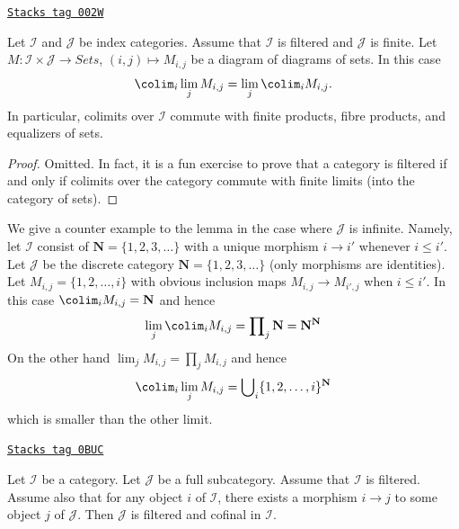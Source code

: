 \begin{lemma}
\label{categories-lemma-directed-commutes}
\href{https://stacks.math.columbia.edu/tag/002W}{\texttt{Stacks tag 002W}}

Let $\mathcal{I}$ and $\mathcal{J}$ be index categories.
Assume that $\mathcal{I}$ is filtered and $\mathcal{J}$ is finite.
Let $M : \mathcal{I} \times \mathcal{J} \to \textit{Sets}$,
$(i, j) \mapsto M_{i, j}$ be a diagram of diagrams of sets.
In this case
$$
\colim_i \lim_j M_{i, j}
=
\lim_j \colim_i M_{i, j}.
$$
In particular, colimits over $\mathcal{I}$ commute with finite products,
fibre products, and equalizers of sets.
\end{lemma}

\begin{proof}
Omitted. In fact, it is a fun exercise to prove that a category is
filtered if and only if colimits over the category commute with finite
limits (into the category of sets).
\end{proof}

We give a counter example to the lemma in
the case where $\mathcal{J}$ is infinite. Namely, let
$\mathcal{I}$ consist of $\mathbf{N} = \{1, 2, 3, \ldots\}$
with a unique morphism $i \to i'$ whenever $i \leq i'$.
Let $\mathcal{J}$ be the discrete category
$\mathbf{N} = \{1, 2, 3, \ldots\}$ (only morphisms are identities).
Let $M_{i, j} = \{1, 2, \ldots, i\}$ with obvious inclusion maps
$M_{i, j} \to M_{i', j}$ when $i \leq i'$. In this case
$\colim_i M_{i, j} = \mathbf{N}$ and hence
$$
\lim_j \colim_i M_{i, j}
=
\prod\nolimits_j \mathbf{N}
=
\mathbf{N}^\mathbf{N}
$$
On the other hand $\lim_j M_{i, j} = \prod\nolimits_j M_{i, j}$ and
hence
$$
\colim_i \lim_j M_{i, j}
=
\bigcup\nolimits_i \{1, 2, \ldots, i\}^{\mathbf{N}}
$$
which is smaller than the other limit.

\begin{lemma}
\label{categories-lemma-cofinal-in-filtered}
\href{https://stacks.math.columbia.edu/tag/0BUC}{\texttt{Stacks tag 0BUC}}

\begin{reference}
\cite[Proposition 3.2.4]{KS}
\end{reference}
Let $\mathcal{I}$ be a category. Let $\mathcal{J}$ be a full subcategory.
Assume that $\mathcal{I}$ is filtered. Assume also that for any object
$i$ of $\mathcal{I}$, there exists a morphism $i \to j$
to some object $j$ of $\mathcal{J}$. Then $\mathcal{J}$
is filtered and cofinal in $\mathcal{I}$.
\end{lemma}

